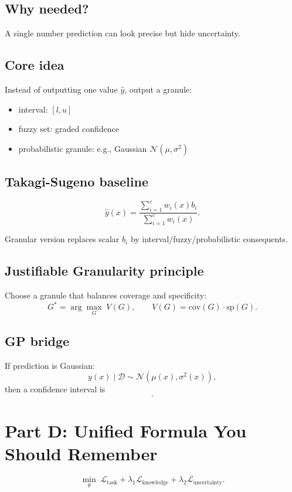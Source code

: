 ﻿\documentclass[11pt,a4paper]{article}
\begin{document}
\subsection{Why needed?}
A single number prediction can look precise but hide uncertainty.

\subsection{Core idea}
Instead of outputting one value $\hat y$, output a granule:
\begin{itemize}
\item interval: $[l,u]$
\item fuzzy set: graded confidence
\item probabilistic granule: e.g., Gaussian $\mathcal{N}(\mu,\sigma^2)$
\end{itemize}

\subsection{Takagi-Sugeno baseline}
\begin{equation}
\hat y(x)=\frac{\sum_{i=1}^{c} w_i(x)b_i}{\sum_{i=1}^{c} w_i(x)}.
\end{equation}

Granular version replaces scalar $b_i$ by interval/fuzzy/probabilistic consequents.

\subsection{Justifiable Granularity principle}
Choose a granule that balances coverage and specificity:
\begin{equation}
G^*=\arg\max_G\;V(G),\qquad V(G)=\mathrm{cov}(G)\cdot\mathrm{sp}(G).
\end{equation}

\subsection{GP bridge}
If prediction is Gaussian:
\begin{equation}
y(x)\mid\mathcal D\sim \mathcal N(\mu(x),\sigma^2(x)),
\end{equation}
then a confidence interval is
\begin{equation}
[\mu-z\sigma,\;\mu+z\sigma].
\end{equation}

\section{Part D: Unified Formula You Should Remember}
\begin{equation}
\min_{\theta}\;\mathcal L_{\text{task}} + \lambda_1\mathcal L_{\text{knowledge}} + \lambda_2\mathcal L_{\text{uncertainty}}.
\end{equation}
\end{document}
